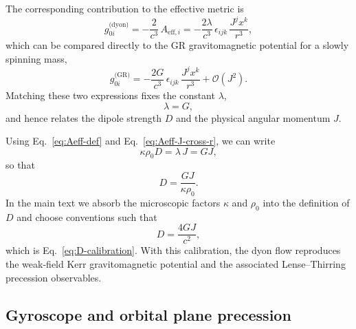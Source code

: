 \documentclass[11pt]{article}
\begin{document}
The corresponding contribution to the effective metric is
\begin{equation}
  g_{0i}^{\text{(dyon)}}
  = -\frac{2}{c^3}\,A_{\text{eff},i}
  = -\frac{2\lambda}{c^3}\,
    \epsilon_{ijk}\,\frac{J^j x^k}{r^3},
\end{equation}
which can be compared directly to the GR gravitomagnetic potential
for a slowly spinning mass,
\begin{equation}
  g_{0i}^{\text{(GR)}}
  = -\frac{2G}{c^3}\,
    \epsilon_{ijk}\,\frac{J^j x^k}{r^3}
  + \mathcal{O}(J^2).
\end{equation}
Matching these two expressions fixes the constant $\lambda$,
\begin{equation}
  \lambda = G,
\end{equation}
and hence relates the dipole strength $D$ and the physical angular
momentum $J$.

Using Eq.~\eqref{eq:Aeff-def} and Eq.~\eqref{eq:Aeff-J-cross-r}, we
can write
\begin{equation}
  \kappa\rho_0 D
  = \lambda\,J
  = GJ,
\end{equation}
so that
\begin{equation}
  D
  = \frac{GJ}{\kappa\rho_0}.
\end{equation}
In the main text we absorb the microscopic factors $\kappa$ and
$\rho_0$ into the definition of $D$ and choose conventions such that
\begin{equation}
  D = \frac{4GJ}{c^2},
\end{equation}
which is Eq.~\eqref{eq:D-calibration}.
With this calibration, the dyon flow reproduces the weak-field Kerr
gravitomagnetic potential and the associated Lense--Thirring
precession observables.

\subsection{Gyroscope and orbital plane precession}
\end{document}
